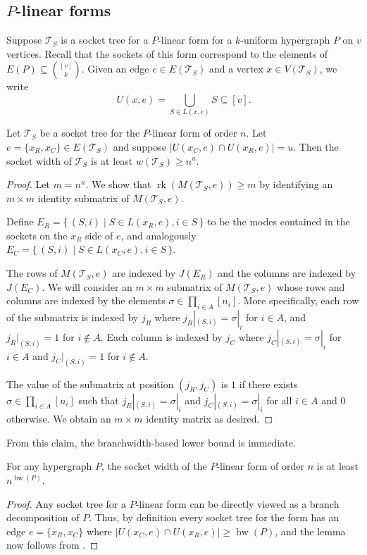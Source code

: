 \documentclass{toc}
\DeclareMathOperator{\bw}{bw}
\newcommand{\rk}{\ensuremath{\operatorname{rk}}}
\newcommand{\ts}{\ensuremath{\mathcal{T}_S}}
\begin{document}
%
\subsection{\texorpdfstring{$P$-linear}{P-linear} forms}

Suppose $\ts$ is a socket tree for a $P$-linear form for a $k$-uniform
hypergraph $P$ on $v$ vertices.
Recall that the sockets of this form correspond to the elements
of $E(P) \subseteq \binom{[v]}{k}$.
Given an edge $e \in E(\ts)$ and a vertex $x
\in V(\ts)$, we write \[U(x, e)=\bigcup_{S \in L(x,e)} S \subseteq [v].\]

\begin{claim}
  \label{claim:binom form sockwidth lb 1}
  Let $\ts$ be a socket tree for the $P$-linear form of order $n$.
  Let $e =
  \{x_R, x_C\} \in E(\ts)$ and suppose $|U(x_C, e) \cap U(x_R, e)|= u$.
  Then the socket width of $\ts$ is at least $w(\ts) \ge n^{u}$.

\end{claim}

\begin{proof}
  Let $m = n^u$. We show that $\rk(M(\ts, e)) \ge
  m$ by identifying an $m \times m$ identity submatrix of $M(\ts, e)$.

  Define $E_R = \{\,(S, i) \mid S \in L(x_R, e), i \in S\,\}$
  to be the modes contained in the sockets on the $x_R$ side of $e$, and analogously %
  $E_C
  = \{\,(S, i) \mid S \in L(x_C, e), i \in S\,\}$.

  The rows of $M(\ts, e)$ are indexed by $J(E_R)$ and the columns are indexed by $J(E_C)$. We will consider an $m \times m$ submatrix of $M(\ts, e)$ whose rows and columns are indexed by the elements $\sigma \in \prod_{i \in A} [n_i]$. More specifically, each row of the submatrix is indexed by $j_R$ where $j_R|_{(S,i)}=\sigma|_i$ for $i \in A$, and $j_R|_{(S,i)} = 1$ for $i \not \in A$. Each column is indexed by $j_C$ where $j_C|_{(S,i)}=\sigma|_i$ for $i \in A$ and $j_C|_{(S,i)}=1$  for $i \not \in A$.

The value of the submatrix at position $(j_{R}, j_{C})$ is $1$ if there exists $\sigma \in \prod_{i \in A} [n_i]$ such that $j_R|_{(S,i)}=\sigma|_i$ and $j_C|_{(S,i)}=\sigma|_i$ for all $i \in A$ and $0$ otherwise. We obtain
  an $m \times m$ identity matrix as desired.
\end{proof}

From this claim, the branchwidth-based lower bound is immediate.

\begin{lemma}
  \label{lem:lb-binom-2}
  For any hypergraph $P$, the socket width of the $P$-linear form
  of order $n$ is at least $n^{\bw(P)}$.
\end{lemma}
\begin{proof}
  Any socket tree for a $P$-linear form can be directly
  viewed as a branch decomposition of $P$.  Thus, by definition every
  socket tree for the form has an edge $e = \{x_R, x_C\}$ where
  $|U(x_C,e) \cap U(x_R,e)| \ge \bw(P)$, and the lemma now follows
  from .
\end{proof}
\end{document}
